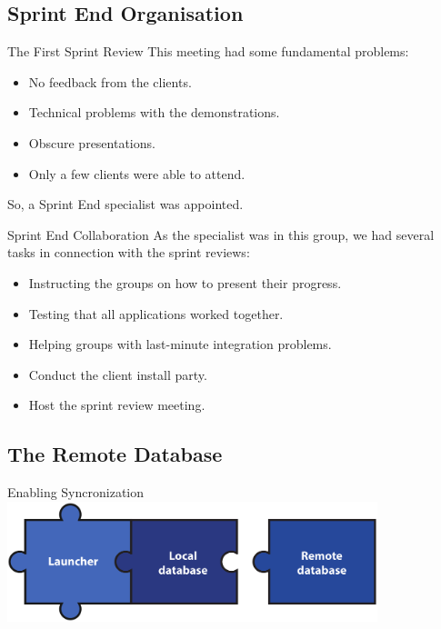 \subsection{Sprint End Organisation}

\begin{frame}{The First Sprint Review}
	This meeting had some fundamental problems:
	\begin{itemize}
		\item No feedback from the clients.
		\item Technical problems with the demonstrations.
		\item Obscure presentations.
		\item Only a few clients were able to attend.
	\end{itemize}
	So, a Sprint End specialist was appointed.
\end{frame}

\begin{frame}{Sprint End Collaboration}
	As the specialist was in this group, we had several tasks in connection with the sprint reviews:
	\begin{itemize}
		\item<1> Instructing the groups on how to present their progress.
		\item<2> Testing that all applications worked together.
		\item<3> Helping groups with last-minute integration problems.
		\item<4> Conduct the client install party.
		\item<5> Host the sprint review meeting.
	\end{itemize}
\end{frame}


\subsection{The Remote Database}

\begin{frame}{Enabling Syncronization}
	\includegraphics[height=3.5cm]{images/giraf-puzzle}
\end{frame}

